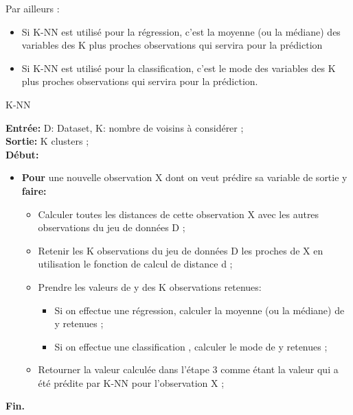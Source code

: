 Par ailleurs  :
\begin{itemize}
	\item Si K-NN est utilisé pour la régression, c’est la moyenne (ou la médiane) des variables des K plus proches observations qui servira pour la prédiction
	 \item Si K-NN est utilisé pour la classification, c’est le mode des variables des K plus proches observations qui servira pour la prédiction\cite{ref32}.
\end{itemize}

 \begin{algorithm}[H]
	\caption{K-NN}
	\hspace*{\algorithmicindent} \textbf{Entrée:} D: Dataset, K: nombre de voisins à considérer ;\\
	\hspace*{\algorithmicindent} \textbf{Sortie:} K clusters ; \\
	\hspace*{\algorithmicindent}\textbf{ Début:}
	\begin{itemize}
		\item [] \textbf{Pour} une nouvelle observation X dont on veut prédire sa variable de sortie y \textbf{faire:}
		\begin{itemize}
			\item [] Calculer toutes les distances de cette observation X avec les autres observations du jeu de données D ;
			\item [] Retenir les K observations du jeu de données D les proches de X en utilisation le fonction de calcul de distance d ;
			\item [] Prendre les valeurs de y des K observations retenues: \begin{itemize}
				\item [] Si on effectue une régression, calculer la moyenne (ou la médiane) de y retenues ;
				\item [] Si on effectue une classification , calculer le mode de y retenues ; 	
			\end{itemize}
			\item [] Retourner la valeur calculée dans l’étape 3 comme étant la valeur qui a été prédite par K-NN pour l’observation X ;
		\end{itemize}

	\end{itemize}
	\hspace*{\algorithmicindent}\textbf{ Fin.}
\end{algorithm} 

